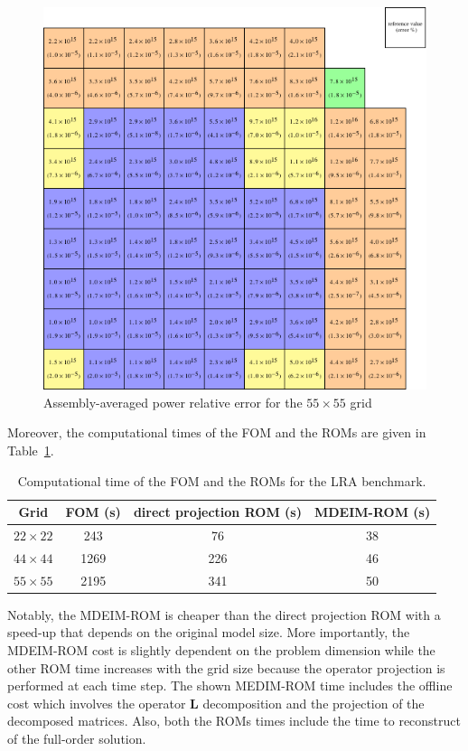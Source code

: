 \documentclass[]{interact}
\theoremstyle{plain}%
\theoremstyle{definition}
\theoremstyle{remark}
\begin{document}
\begin{figure}[H]
	\centering
	\includegraphics[width=0.7\linewidth]{../figures/lra_assemb_fm=5.pdf} 
	\caption{Assembly-averaged power relative error for the $55\times 55$ grid}
	\label{fig:assembly power error fm=5}
\end{figure} 

Moreover, the computational times of the FOM and the ROMs are given in Table~\ref{table:cpu time}.

\begin{table}[h!]
	\centering
	\caption{Computational time of the FOM and the ROMs for the LRA benchmark.}
	\label{table:cpu time}
	\begin{tabular}{c|c|c|c}  
		Grid &	FOM (s)   &  direct projection ROM (s) & MDEIM-ROM (s)    \\
		\hline
		$22\times 22$ &  243   & 76   & 38   \\
		$44\times 44$ &  1269  & 226   & 46   \\
		$55\times 55$ &  2195  & 341   & 50   \\
		\hline
	\end{tabular}
\end{table}

Notably, the MDEIM-ROM is cheaper than the direct projection ROM with a speed-up that depends on the original model size.
More importantly, the MDEIM-ROM cost is slightly dependent on the problem dimension while the other ROM time increases with the grid size because the operator projection is performed at each time step.
The shown MEDIM-ROM time includes the offline cost which involves the operator $\mathbf{L}$ decomposition and the projection of the decomposed matrices.
Also, both the ROMs times include the time to reconstruct of the full-order solution.
\end{document}
